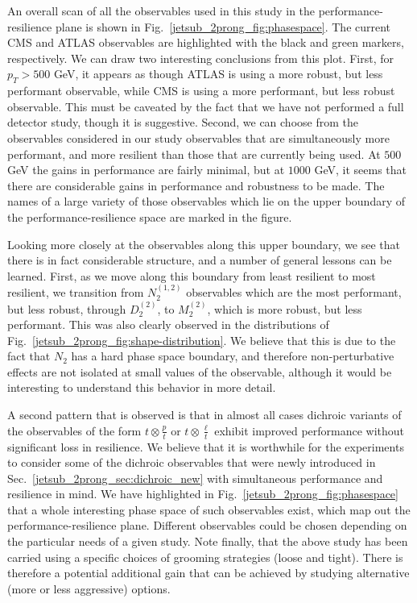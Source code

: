 \documentclass[11pt]{cernrep}
\begin{document}
An overall scan of all the observables used in this study in the performance-resilience plane is shown in Fig.~\ref{jetsub_2prong_fig:phasespace}.
%
The current CMS and ATLAS observables are highlighted with the black and green markers, respectively. We can draw two interesting conclusions from this plot.
%
First, for $p_T> 500$ GeV, it appears as though ATLAS is using a more robust, but less performant observable, while CMS is using a more performant, but less robust observable.
%
This must be caveated by the fact that we have not performed a full detector study, though it is suggestive.
%
Second, we can choose from the observables considered in our study observables that are simultaneously more performant, and more resilient than those that are currently being used.
%
At $500$ GeV the gains in performance are fairly minimal, but at $1000$ GeV, it seems that there are considerable gains in performance and robustness to be made.
%
The names of a large variety of those observables which lie on the upper boundary of the performance-resilience space are marked in the figure. 


Looking more closely at the observables along this upper boundary, we see that there is in fact considerable structure, and a number of general lessons can be learned.
%
First, as we move along this boundary from least resilient to most resilient, we transition from $N_2^{(1,2)}$ observables which are the most performant, but less robust, through $D_2^{(2)}$, to $M_2^{(2)}$, which is more robust, but less performant.
%
This was also clearly observed in the distributions of Fig.~\ref{jetsub_2prong_fig:shape-distribution}.
%
We believe that this is due to the fact that $N_2$ has a hard phase space boundary, and therefore non-perturbative effects are not isolated at small values of the observable, although it would be interesting to understand this behavior in more detail. 

A second pattern that is observed is that in almost all cases dichroic variants of the observables of the form $t\otimes \frac{p}{t}$ or $t\otimes\frac{\ell}{t}$ exhibit improved performance without significant loss in resilience.
%
We believe that it is worthwhile for the experiments to consider some of the dichroic observables that were newly introduced in Sec.~\ref{jetsub_2prong_sec:dichroic_new} with simultaneous performance and resilience in mind.
%
We have highlighted in Fig.~\ref{jetsub_2prong_fig:phasespace} that a whole interesting phase space of such observables exist, which map out the performance-resilience plane.
%
Different observables could be chosen depending on the particular
needs of a given study.
%
Note finally, that the above study has been carried using a specific
choices of grooming strategies (loose and tight). There is therefore a
potential additional gain that can be achieved by studying alternative
(more or less aggressive) options.
\end{document}
